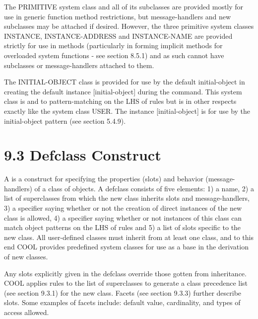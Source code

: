 \documentclass[letterpaper,10pt,english]{sphinxmanual}
\begin{document}
The PRIMITIVE system class and all of its subclasses are provided mostly
for use in generic function method restrictions, but message-handlers
and new subclasses may be attached if desired. However, the three
primitive system classes INSTANCE, INSTANCE-ADDRESS and INSTANCE-NAME
are provided strictly for use in methods (particularly in forming
implicit methods for overloaded system functions - see section 8.5.1)
and as such cannot have subclasses or message-handlers attached to them.

The INITIAL-OBJECT class is provided for use by the default
 initial-object in creating the default instance
{[}initial-object{]} during the  command. This system class is
 and  to pattern-matching on the LHS of rules
but is in other respects exactly like the system class USER. The
instance {[}initial-object{]} is for use by the initial-object pattern (see
section 5.4.9).


\section{9.3 Defclass Construct}
\label{\detokenize{cool:defclass-construct}}
A  is a construct for specifying the properties (slots) and
behavior (message-handlers) of a class of objects. A defclass consists
of five elements: 1) a name, 2) a list of superclasses from which the
new class inherits slots and message-handlers, 3) a specifier saying
whether or not the creation of direct instances of the new class is
allowed, 4) a specifier saying whether or not instances of this class
can match object patterns on the LHS of rules and 5) a list of slots
specific to the new class. All user-defined classes must inherit from at
least one class, and to this end COOL provides predefined system classes
for use as a base in the derivation of new classes.

Any slots explicitly given in the defclass override those gotten from
inheritance. COOL applies rules to the list of superclasses to generate
a class precedence list (see section 9.3.1) for the new class. Facets
(see section 9.3.3) further describe slots. Some examples of facets
include: default value, cardinality, and types of access allowed.

\end{document}
